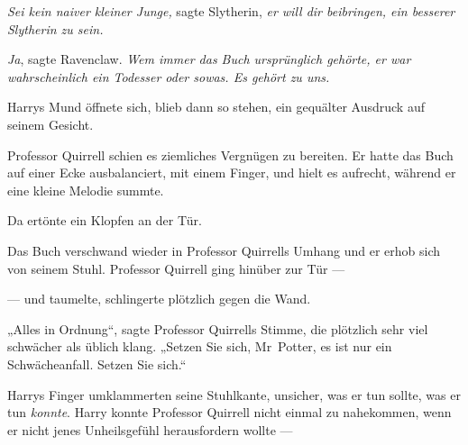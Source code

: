 \emph{Sei kein naiver kleiner Junge,} sagte Slytherin, \emph{er will dir beibringen, ein besserer Slytherin zu sein.}

\emph{Ja}, sagte Ravenclaw. \emph{Wem immer das Buch ursprünglich gehörte, er war wahrscheinlich ein Todesser oder sowas. Es gehört zu uns.}

Harrys Mund öffnete sich, blieb dann so stehen, ein gequälter Ausdruck auf seinem Gesicht.

Professor Quirrell schien es ziemliches Vergnügen zu bereiten. Er hatte das Buch auf einer Ecke ausbalanciert, mit einem Finger, und hielt es aufrecht, während er eine kleine Melodie summte.

Da ertönte ein Klopfen an der Tür.

Das Buch verschwand wieder in Professor Quirrells Umhang und er erhob sich von seinem Stuhl. Professor Quirrell ging hinüber zur Tür —

— und taumelte, schlingerte plötzlich gegen die Wand.

„Alles in Ordnung“, sagte Professor Quirrells Stimme, die plötzlich sehr viel schwächer als üblich klang.
„Setzen Sie sich, Mr~Potter, es ist nur ein Schwächeanfall. Setzen Sie sich.“%

Harrys Finger umklammerten seine Stuhlkante, unsicher, was er tun sollte, was er tun \emph{konnte}. Harry konnte Professor Quirrell nicht einmal zu nahekommen, wenn er nicht jenes Unheilsgefühl herausfordern wollte —

